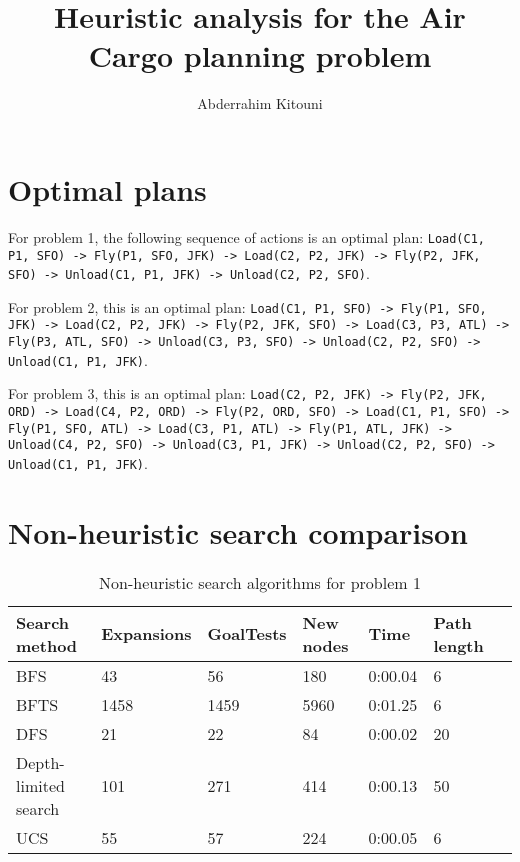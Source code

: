 \documentclass[11pt]{article}
\title{Heuristic analysis for the Air Cargo planning problem}
\author{Abderrahim Kitouni}
\begin{document}
\maketitle

\section{Optimal plans}
For problem 1, the following sequence of actions is an optimal plan:
\texttt{Load(C1, P1, SFO) -> Fly(P1, SFO, JFK) -> Load(C2, P2, JFK) -> Fly(P2, JFK, SFO) -> Unload(C1, P1, JFK) -> Unload(C2, P2, SFO)}. \vspace{1em}

For problem 2, this is an optimal plan:
\texttt{Load(C1, P1, SFO) -> Fly(P1, SFO, JFK) -> Load(C2, P2, JFK) -> Fly(P2, JFK, SFO) -> Load(C3, P3, ATL) -> Fly(P3, ATL, SFO) -> Unload(C3, P3, SFO) -> Unload(C2, P2, SFO) -> Unload(C1, P1, JFK)}. \vspace{1em}

For problem 3, this is an optimal plan:
\texttt{Load(C2, P2, JFK) -> Fly(P2, JFK, ORD) -> Load(C4, P2, ORD) -> Fly(P2, ORD, SFO) -> Load(C1, P1, SFO) -> Fly(P1, SFO, ATL) -> Load(C3, P1, ATL) -> Fly(P1, ATL, JFK) -> Unload(C4, P2, SFO) -> Unload(C3, P1, JFK) -> Unload(C2, P2, SFO) -> Unload(C1, P1, JFK)}.

\section{Non-heuristic search comparison}
\begin{table}[h]
\begin{center}
\begin{tabular}{|l|l|l|l|l|l|l|}
  \hline
  Search method & Expansions & GoalTests & New nodes & Time    & Path length \\
  \hline
  BFS           & 43         & 56        & 180       & 0:00.04 & 6           \\
  \hline
  BFTS          & 1458       & 1459      & 5960      & 0:01.25 & 6           \\
  \hline
  DFS           & 21         & 22        & 84        & 0:00.02 & 20          \\
  \hline
  Depth-limited search & 101 & 271       & 414       & 0:00.13 & 50          \\
  \hline
  UCS           & 55         & 57        & 224       & 0:00.05 & 6           \\
  \hline
\end{tabular}
\caption{Non-heuristic search algorithms for problem 1} \label{pb1}
\end{center}
\end{table}
\end{document}
